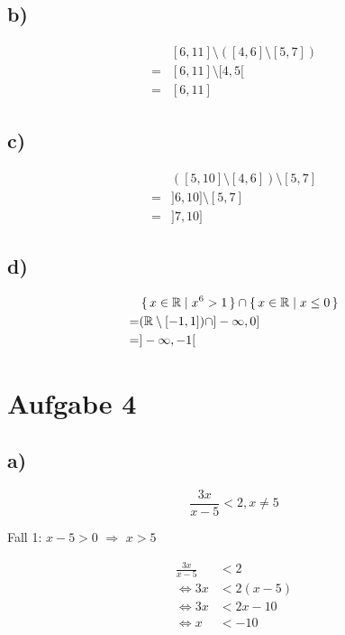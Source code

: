 \documentclass[a4paper, 11pt]{article}
\begin{document}
\subsection{b)}
\label{sec:orgfd213fc}
\begin{align*}
    & [6, 11] \setminus ([4, 6] \setminus [5, 7]) \\
    =& [6, 11] \setminus [4, 5[ \\
    =& [6, 11]
\end{align*}

\subsection{c)}
\label{sec:orgaccedb2}
\begin{align*}
    & ([5, 10] \setminus [4, 6]) \setminus [5, 7] \\
    =& ]6, 10] \setminus [5, 7] \\
    =& ]7, 10]
\end{align*}

\subsection{d)}
\label{sec:org855194e}
\begin{align*}
    & \set{x \in \mathbb{R} | x^6 > 1} \cap \set{x \in \mathbb{R} | x \leq 0} \\
    =& (\mathbb{R} \setminus [-1, 1]) \cap ]-\infty, 0] \\
    =& ]-\infty, -1[
\end{align*}

\section{Aufgabe 4}
\label{sec:org53b89b5}
\subsection{a)}
\label{sec:org045dd62}
$$ \frac{3x}{x-5} < 2, x \neq 5 $$

Fall 1: \(x - 5 > 0\) \(\Rightarrow\) \(x > 5\)

\begin{align*}
    \frac{3x}{x-5} &< 2 \\
    \Leftrightarrow 3x &< 2(x-5) \\
    \Leftrightarrow 3x &< 2x-10 \\
    \Leftrightarrow x &< -10
\end{align*}
\end{document}
